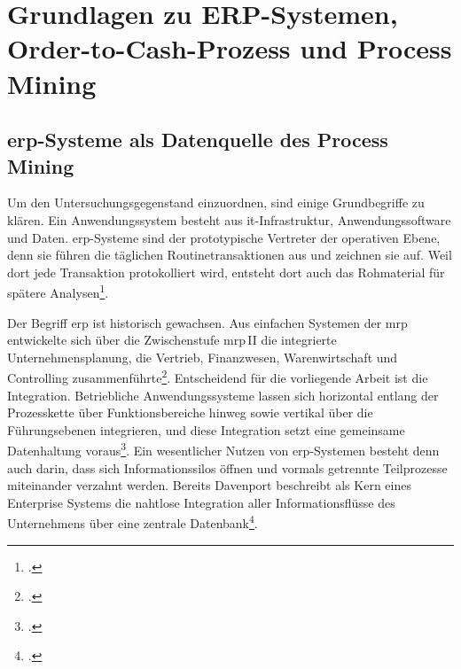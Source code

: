 \chapter{Grundlagen zu ERP-Systemen, Order-to-Cash-Prozess und Process Mining}\label{ch:grundlagen}


\section{\gls{erp}-Systeme als Datenquelle des Process Mining}\label{sec:erp-grundlagen}

Um den Untersuchungsgegenstand einzuordnen, sind einige Grundbegriffe zu klären. Ein Anwendungssystem besteht aus \gls{it}-Infrastruktur, Anwendungssoftware und Daten. \gls{erp}-Systeme sind der prototypische Vertreter der operativen Ebene, denn sie führen die täglichen Routinetransaktionen aus und zeichnen sie auf. Weil dort jede Transaktion protokolliert wird, entsteht dort auch das Rohmaterial für spätere Analysen\footcite[Vgl.][S.~4]{gronau2014erp}.

Der Begriff \gls{erp} ist historisch gewachsen. Aus einfachen Systemen der \gls{mrp} entwickelte sich über die Zwischenstufe \gls{mrp}\,II die integrierte Unternehmensplanung, die Vertrieb, Finanzwesen, Warenwirtschaft und Controlling zusammenführte\footcite[Vgl.][S.~4]{gronau2014erp}. Entscheidend für die vorliegende Arbeit ist die Integration. Betriebliche Anwendungssysteme lassen sich horizontal entlang der Prozesskette über Funktionsbereiche hinweg sowie vertikal über die Führungsebenen integrieren, und diese Integration setzt eine gemeinsame Datenhaltung voraus\footcite[Vgl.][S.~4]{gronau2014erp}. Ein wesentlicher Nutzen von \gls{erp}-Systemen besteht denn auch darin, dass sich Informationssilos öffnen und vormals getrennte Teilprozesse miteinander verzahnt werden. Bereits Davenport beschreibt als Kern eines Enterprise Systems die nahtlose Integration aller Informationsflüsse des Unternehmens über eine zentrale Datenbank\footcites(Vgl.)()[S.~121 ff.]{davenport1998enterprise}[S.~109 f.]{nadukuru2024o2c}.

